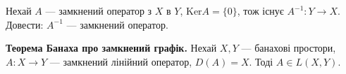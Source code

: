 \begin{exercise}\label{N:2_1_14}
    Нехай $A$ --- замкнений оператор з $X$ в $Y$, $\mathrm{Ker} A = \{ 0\}$,
    тож існує $A^{-1} : Y \to X$. Довести: $A^{-1}$ --- замкнений оператор.
\end{exercise}

\begin{theory}
    \textbf{Теорема Банаха про замкнений графік.}
    Нехай $X, Y$ --- банахові простори, $A : X \to Y$ --- замкнений лінійний оператор, $D(A) = X$.
    Тоді $A \in L(X, Y)$. 
\end{theory}